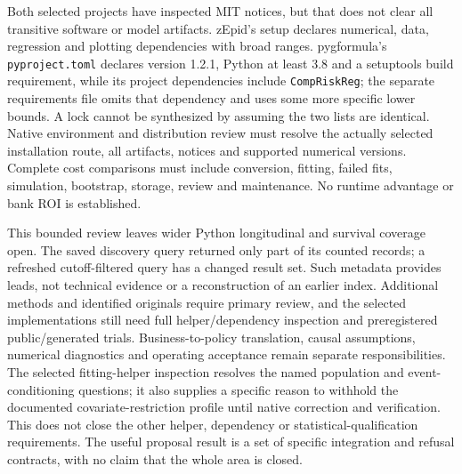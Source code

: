 Both selected projects have inspected MIT notices, but that does not clear
all transitive software or model artifacts. zEpid's setup declares numerical,
data, regression and plotting dependencies with broad ranges. pygformula's
\texttt{pyproject.toml} declares version 1.2.1, Python at least 3.8 and a
setuptools build requirement, while its project dependencies include
\texttt{CompRiskReg}; the separate requirements file omits that dependency
and uses some more specific lower bounds. A lock cannot be synthesized by
assuming the two lists are identical. Native environment and distribution
review must resolve the actually selected installation route, all artifacts,
notices and supported numerical versions. Complete cost comparisons must
include conversion, fitting, failed fits, simulation, bootstrap, storage,
review and maintenance. No runtime advantage or bank ROI is established.
\citep{exec24_longpy_zepid_source,exec24_longpy_pygformula_source}

This bounded review leaves wider Python longitudinal and survival coverage
open. The saved discovery query returned only part of its counted records;
a refreshed cutoff-filtered query has a changed result set. Such metadata
provides leads, not technical evidence or a reconstruction of an earlier
index. Additional methods and identified originals require primary review,
and the selected implementations still need full helper/dependency inspection
and preregistered public/generated trials. Business-to-policy translation,
causal assumptions, numerical diagnostics and operating acceptance remain
separate responsibilities. The selected fitting-helper inspection resolves
the named population and event-conditioning questions; it also supplies a
specific reason to withhold the documented covariate-restriction profile
until native correction and verification. This does not close the other
helper, dependency or statistical-qualification requirements. The useful proposal result is a set of specific
integration and refusal contracts, with no claim that the whole area is closed.
